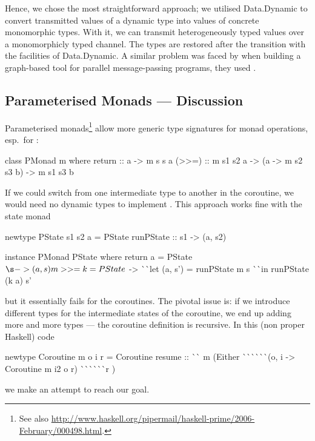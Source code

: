%


Hence, we chose the most straightforward approach; we utilised \textsf{Data.Dynamic} to convert transmitted values of a dynamic type into values of concrete monomorphic types.
With it, we can transmit heterogeneously typed values over a monomorphicly typed channel.
The types are restored after the transition with the facilities of \textsf{Data.Dynamic}.
A similar problem was faced by \citeauthor{grace-tfp} when building a graph-based tool for parallel message-passing programs, they used  \cite{grace-tfp}.

\subsection{Parameterised Monads --- Discussion}
\label{sec:param-monads-disc}
Parameterised monads\footnote{See also \url{http://www.haskell.org/pipermail/haskell-prime/2006-February/000498.html}.}  allow more generic type signatures for monad operations, esp.\ for \hs{>>=}\xspace\nolinebreak[4] \cite{CambridgeJournals:8240527,Ghani:2005:MAG:1090189.1086403,monad-parametrisable}:
\begin{code}
class PMonad m where
  return :: a -> m s s a
  (>>=)  :: m s1 s2 a -> (a -> m s2 s3 b) -> m s1 s3 b
\end{code}
If we could switch from one  intermediate type to another in the
coroutine, we would need no dynamic types to implement \soosim.
This approach works fine with the state monad
\begin{code}
newtype PState s1 s2 a
  = PState { runPState :: s1 -> (a, s2) }

instance PMonad PState where
  return a  = PState $ \s -> (a, s)
  m >>= k   = PState $ \s ->
                ^^ ^^ let (a, s') = runPState m s
                ^^ ^^ in  runPState (k a) s'
\end{code}
but it essentially fails for the coroutines.
The pivotal issue is: if we introduce different types for the intermediate states of the coroutine, we end up adding more and more types --- the coroutine definition is recursive.
In this (non proper Haskell) code
\begin{code}
newtype Coroutine m o i r
  =  Coroutine { resume ::
       ^^ ^^  m (Either
       ^^ ^^ ^^ ^^ ^^ ^^ (o, i -> Coroutine m i2 o r)
       ^^ ^^ ^^ ^^ ^^ ^^ r ) }
\end{code}
we make an attempt to reach our goal.
